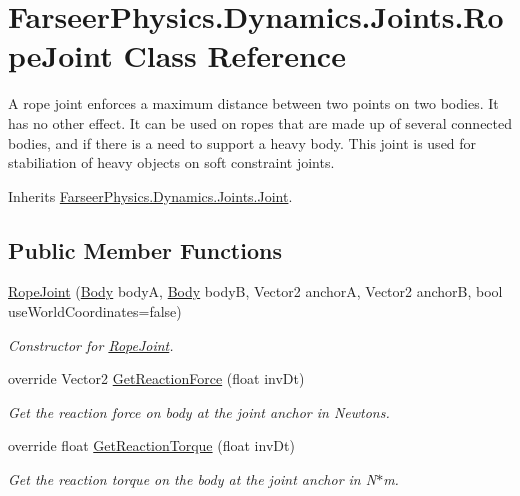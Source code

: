 \hypertarget{class_farseer_physics_1_1_dynamics_1_1_joints_1_1_rope_joint}{\section{Farseer\+Physics.\+Dynamics.\+Joints.\+Rope\+Joint Class Reference}
\label{class_farseer_physics_1_1_dynamics_1_1_joints_1_1_rope_joint}
}


A rope joint enforces a maximum distance between two points on two bodies. It has no other effect. It can be used on ropes that are made up of several connected bodies, and if there is a need to support a heavy body. This joint is used for stabiliation of heavy objects on soft constraint joints.  




Inherits \hyperlink{class_farseer_physics_1_1_dynamics_1_1_joints_1_1_joint}{Farseer\+Physics.\+Dynamics.\+Joints.\+Joint}.

\subsection*{Public Member Functions}
\begin{DoxyCompactItemize}
\item 
\hyperlink{class_farseer_physics_1_1_dynamics_1_1_joints_1_1_rope_joint_ab2bc2aa68616b32bdf97da3da41d24c9}{Rope\+Joint} (\hyperlink{class_farseer_physics_1_1_dynamics_1_1_body}{Body} body\+A, \hyperlink{class_farseer_physics_1_1_dynamics_1_1_body}{Body} body\+B, Vector2 anchor\+A, Vector2 anchor\+B, bool use\+World\+Coordinates=false)
\begin{DoxyCompactList}\small\item\em Constructor for \hyperlink{class_farseer_physics_1_1_dynamics_1_1_joints_1_1_rope_joint}{Rope\+Joint}. \end{DoxyCompactList}\item 
override Vector2 \hyperlink{class_farseer_physics_1_1_dynamics_1_1_joints_1_1_rope_joint_a74aa0f9ba87f866ac03a176743f7398a}{Get\+Reaction\+Force} (float inv\+Dt)
\begin{DoxyCompactList}\small\item\em Get the reaction force on body at the joint anchor in Newtons. \end{DoxyCompactList}\item 
override float \hyperlink{class_farseer_physics_1_1_dynamics_1_1_joints_1_1_rope_joint_a4d03626df0cd9e34c9129efce2215884}{Get\+Reaction\+Torque} (float inv\+Dt)
\begin{DoxyCompactList}\small\item\em Get the reaction torque on the body at the joint anchor in N$\ast$m. \end{DoxyCompactList}\end{DoxyCompactItemize}
